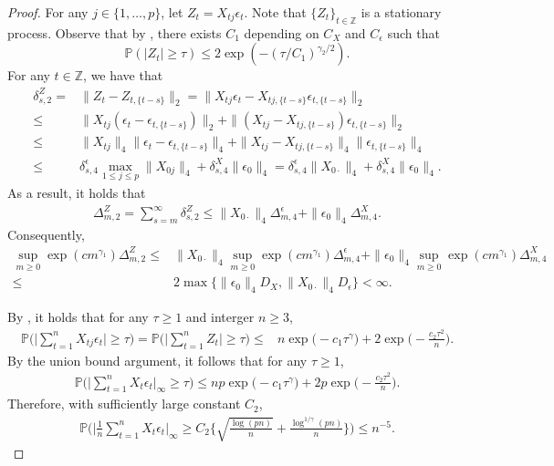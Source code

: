 \documentclass[11pt]{article}
\newcommand{\p}{\mathbb P}
\theoremstyle{plain}
\theoremstyle{definition}
\begin{document}
 \begin{proof} 
  For any $j \in \{1,\ldots,p\} $,
 let $ Z_t  = X_{t j}\epsilon_t $. Note that $\{Z_t\}_{t \in \mathbb{Z}}$ is a stationary process.     
 Observe that by ,  there exists $C_1$  depending on $C_X$ and $ C_\epsilon$ such that
 $$\p ( |Z_t| \ge \tau) \le 2 \exp(- (\tau/C_1)^ {\gamma_2/2}).$$
For any $ t\in \mathbb Z$, we have that
 \begin{align*} 
 \delta_{s, 2}^Z  =& \|Z_t - Z_{t,\{ t-s\}} \|_2 = \|X_{t j}\epsilon_t - X_{t j,\{ t-s\} }\epsilon_{t,\{ t-s\}}    \|_2
 \\
 \le & \| X_{t j} (\epsilon_t -\epsilon_{t,\{ t-s\}}  )\|_2 +  \|  (X_{t j} -X_{t j, \{ t-s\}}  ) \epsilon_{t, \{ t-s\} }  \|_2
 \\
 \le & \|  X_{t j}\|_4  \| \epsilon_t -\epsilon_{t,\{ t-s\}}   \|_4 +  \|   X_{t j} -X_{t j, \{ t-s\}}   \|_4 \| \epsilon_{t, \{ t-s\} }  \|_4
 \\
 \le & \delta^{\epsilon}_{s ,4}\max_{1 \leq j \leq p}\|X_{0j}\|_4   + \delta^X_{s ,4}  \|\epsilon_0\|_{4}  = \delta^{\epsilon}_{s ,4}\|X_{0\cdot}\|_4   + \delta^X_{s ,4}  \|\epsilon_0\|_{4}.
 \end{align*}
 As a result, it holds that
\begin{align*}
    \Delta_{m, 2} ^Z   =    \sum_{s = m}^{\infty}\delta ^Z   _{s, 2}  \le \|X_{0\cdot}\|_4  \Delta ^\epsilon_{m ,4}  
    +\|\epsilon_0\|_{4}   \Delta ^X_{m ,4}   .
\end{align*}
Consequently, 
 \begin{align*} 
    \sup_{m \geq 0} \exp(cm^{\gamma_1}) \Delta_{m,2} ^Z    \leq&    \|X_{0\cdot}\|_4     \sup_{m \geq 0}\exp(cm^{\gamma_1}) \Delta ^\epsilon_{m ,4}  
    +\|\epsilon_0\|_{4}  \sup_{m \geq 0}\exp(cm^{\gamma_1})  \Delta ^X_{m ,4} \\
    \le &    2\max\{\|\epsilon_0\|_{4}D_X,  \|X_{0\cdot}\|_4D_\epsilon\} < \infty.
\end{align*}  

By , it  holds that for any $\tau \ge 1$ and interger $n \geq 3$, 
\begin{align*}
  \p\bigg(   \bigg| \sum_{t=1}^n X_{tj} \epsilon_t  \bigg|  \ge \tau   \bigg) =   \mathbb{P}\Big( \Big|\sum_{ t  = 1}^nZ _t \Big| \geq \tau  \Big) \leq& n\exp\Big(-c_1  \tau ^{\gamma} \Big) + 2 \exp\Big(-\frac{c_2 \tau ^2}{ n   }\Big).
\end{align*}  
By the union bound argument, it follows that for any $\tau \ge 1$,
\begin{align*}
  \p\bigg(   \bigg  | \sum_{t=1}^n X_{t } \epsilon_t  \bigg  |_\infty  \ge \tau   \bigg)  \leq  n p\exp\Big(-c_1  \tau ^{\gamma} \Big) + 2 p\exp\Big(-\frac{c_2 \tau ^2}{ n   }\Big).
\end{align*}  
Therefore, with sufficiently large constant $C_2 $,  
\begin{align*}
  \p\bigg(   \bigg | \frac{1}{n}\sum_{t=1}^n X_{t } \epsilon_t  \bigg |_\infty  \ge  C_2 \bigg\{  \sqrt { \frac{\log(pn) }{n}  }  +   \frac{ \log^{1/\gamma }( pn) }{n} \bigg \}  \bigg)   \leq   n^{-5} .
\end{align*} 
 \end{proof}
 
\end{document}
